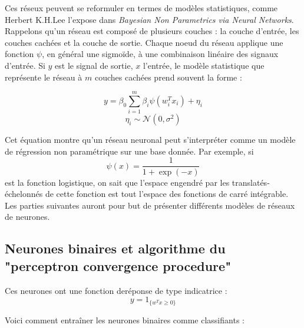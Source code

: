 \documentclass{article}
\theoremstyle{definition}
\begin{document}
Ces réseux peuvent se reformuler en termes de modèles statistiques, comme Herbert K.H.Lee l'expose dans \textit{Bayesian Non Parametrics via Neural Networks}. ~\cite{Lee} Rappelons qu'un réseau est composé de plusieurs couches : la couche d'entrée, les couches cachées et la couche de sortie. Chaque noeud du réseau applique une fonction $\psi$, en général une sigmoïde, à une combinaison linéaire des signaux d'entrée. Si $y$ est le signal de sortie, $x$ l'entrée, le modèle statistique que représente le réseau à $m$ couches cachées prend souvent la forme :

\[y=\beta_0 \sum_{i=1}^m \beta_i\psi(w_i^T x_i) + \eta_i\]
\[\eta_i \sim \mathcal N(0,\sigma^2)\]

Cet équation montre qu'un réseau neuronal peut s'interpréter comme un modèle de régression non paramétrique sur une base donnée. Par exemple, si 
\[\psi(x)=\frac{1}{1+\exp(-x)}\]
est la fonction logistique, on sait que l'espace engendré par les translatés-échelonnés de cette fonction est tout l'espace des fonctions de carré intégrable.\\


Les parties suivantes auront pour but de présenter différents modèles de réseaux de neurones.

 \subsection{Neurones binaires et algorithme du "perceptron convergence procedure"}
Ces neurones ont une fonction deréponse de type indicatrice :
\[y=1_{\{w^Tx\geq 0\}}\]

Voici comment entraîner les neurones binaires comme classifiants :\\

\\
\\
\end{document}
